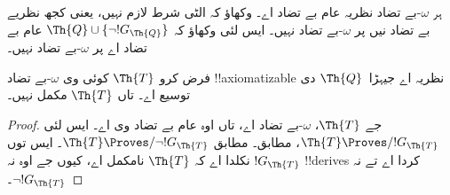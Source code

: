 \documentclass[../../../include/open-logic-section]{subfiles}
\begin{document}
\begin{prob}
ہر $\omega$-بے تضاد نظریہ عام بے تضاد اے۔ وکھاؤ کہ الٹی
شرط لازم نہیں، یعنی کجھ نظریے بے تضاد نیں پر
$\omega$-بے تضاد نہیں۔ ایس لئی وکھاؤ کہ $\Th{Q} \cup
\{\lnot !G_\Th{Q}\}$ عام بے تضاد اے پر $\omega$-بے تضاد
نہیں۔
\end{prob}

\begin{thm}
فرض کرو $\Th{T}$ کوئی وی $\omega$-بے تضاد
!!{axiomatizable} نظریہ اے جیہڑا~$\Th{Q}$ دی توسیع اے۔
تاں $\Th{T}$ مکمل نہیں۔
\end{thm}

\begin{proof}
جے $\Th{T}$، $\omega$-بے تضاد اے، تاں اوہ عام بے تضاد
وی اے۔ ایس لئی $\Th{T}
\Proves/ !G_\Th{T}$،  مطابق۔
 مطابق
$\Th{T} \Proves/ \lnot !G_\Th{T}$۔ ایس توں نکلدا اے کہ
$\Th{T}$ نامکمل اے، کیوں جے اوہ نہ $!G_\Th{T}$ !!{derive}s
کردا اے تے نہ $\lnot !G_\Th{T}$۔
\end{proof}
\end{document}
